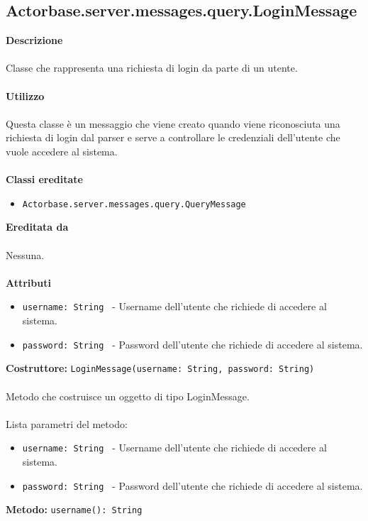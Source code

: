 \documentclass[a4paper]{article}
\begin{document}
	\subsection{Actorbase.server.messages.query.LoginMessage}
		\textbf{Descrizione}
			\\ \\
			Classe che rappresenta una richiesta di login da parte di un utente.
			\\ \\
		\textbf{Utilizzo}
			\\ \\
			Questa classe è un messaggio che viene creato quando viene riconosciuta una richiesta di login dal parser e serve a controllare le credenziali dell'utente che vuole accedere al sistema.
			\\ \\
		\textbf{Classi ereditate}
			\begin{itemize}
				\item \texttt{Actorbase.server.messages.query.QueryMessage }
			\end{itemize}
		\textbf{Ereditata da}
			\\ \\
			Nessuna.
			\\ \\
		\textbf{Attributi}
			\begin{itemize}
				\item \texttt{username: String } - Username dell'utente che richiede di accedere al sistema.
				\item \texttt{password: String } - Password dell'utente che richiede di accedere al sistema.
			\end{itemize}
		\textbf{Costruttore: } \texttt{LoginMessage(username: String, password: String)}
			\\ \\
		Metodo che costruisce un oggetto di tipo LoginMessage.
			\\ \\
		Lista parametri del metodo:
			\begin{itemize}
				\item \texttt{username: String } - Username dell'utente che richiede di accedere al sistema.
				\item \texttt{password: String } - Password dell'utente che richiede di accedere al sistema.
			\end{itemize}
		\textbf{Metodo: } \texttt{username(): String}
			\\ \\
\end{document}
